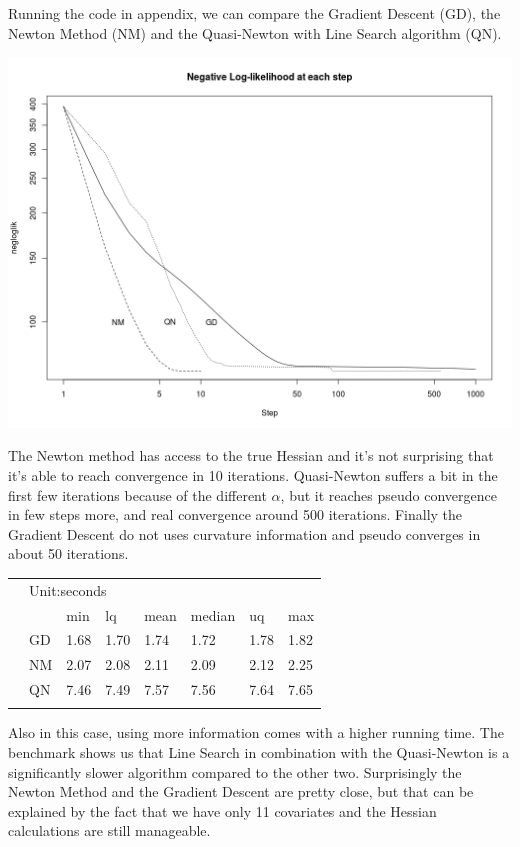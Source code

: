 \documentclass{article}
\begin{document}
Running the code in appendix, we can compare the Gradient Descent (GD), the Newton Method (NM) and the Quasi-Newton with Line Search algorithm (QN).

\includegraphics[width=\textwidth]{Rplot_quasi_newton.png}

The Newton method has access to the true Hessian and it's not surprising that it's able to reach convergence in 10 iterations. Quasi-Newton suffers a bit in the first few iterations because of the different $\alpha$, but it reaches pseudo convergence in few steps more, and real convergence around 500 iterations. Finally the Gradient Descent do not uses curvature information and pseudo converges in about 50 iterations.\\

\begin{tabular}{llllllll}
&\multicolumn{7}{l}{Unit:seconds} \\
&      &min      &  lq     & mean     & median   &     uq   &    max   \\
&GD & 1.68 &1.70 &1.74 &1.72 &1.78 &1.82  \\
&NM & 2.07 &2.08 &2.11 &2.09 &2.12 &2.25  \\
&QN & 7.46 &7.49 &7.57 &7.56 &7.64 &7.65  \\
&\multicolumn{7}{l}{} 
\end{tabular}

Also in this case, using more information comes with a higher running time. The benchmark shows us that Line Search in combination with the Quasi-Newton is a significantly slower algorithm compared to the other two. Surprisingly the Newton Method and the Gradient Descent are pretty close, but that can be explained by the fact that we have only 11 covariates and the Hessian calculations are still manageable.
\end{document}
